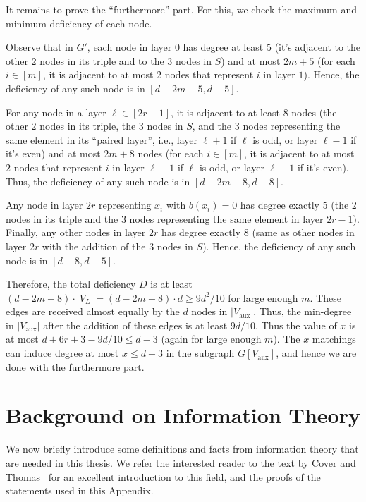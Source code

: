 \documentclass[11pt,letterpaper]{article}
\renewcommand{\geq}{\geqslant}
\renewcommand{\leq}{\leqslant}
\theoremstyle{definition}
\newcommand{\Vaux}{V_{\text{aux}}}
\begin{document}
    It remains to prove the ``furthermore'' part. For this, we check the maximum and minimum deficiency of each node.

    Observe that in $G'$, each node in layer $0$ has degree at least $5$ (it's adjacent to the other $2$ nodes in its triple and to the $3$ nodes in $S$) and at most $2m+5$ (for each $i\in [m]$, it is adjacent to at most $2$ nodes that represent $i$ in layer $1$). Hence, the deficiency of any such node is in $[d-2m-5, d-5]$. 
    
    For any node in a layer $\ell\in [2r-1]$, it is adjacent to at least $8$ nodes (the other $2$ nodes in its triple, the $3$ nodes in $S$, and the $3$ nodes representing the same element in its ``paired layer'', i.e., layer $\ell+1$ if $\ell$ is odd, or layer $\ell-1$ if it's even) and at most $2m+8$ nodes (for each $i\in [m]$, it is adjacent to at most $2$ nodes that represent $i$ in layer $\ell-1$ if $\ell$ is odd, or layer $\ell+1$ if it's even). Thus, the deficiency of any such node is in $[d-2m-8, d-8]$.

    Any node in layer $2r$ representing $x_i$ with $b(x_i)=0$ has degree exactly $5$ (the $2$ nodes in its triple and the $3$ nodes representing the same element in layer $2r-1$). Finally, any other nodes in layer $2r$ has degree exactly $8$ (same as other nodes in layer $2r$ with the addition of the $3$ nodes in $S$). Hence, the deficiency of any such node is in $[d-8, d-5]$. 

    Therefore, the total deficiency $D$ is at least $(d-2m-8)\cdot |V_L|= (d-2m-8)\cdot d \geq 9d^2/10$ for large enough $m$. These edges are received almost equally by the $d$ nodes in $|\Vaux|$. Thus, the min-degree in $|\Vaux|$ after the addition of these edges is at least $9d/10$. Thus the value of $x$ is at most $d+6r+3-9d/10\leq d-3$ (again for large enough $m$). The $x$ matchings can induce degree at most $x\leq d-3$ in the subgraph $G[\Vaux]$, and hence we are done with the furthermore part.    




\section{Background on Information Theory}\label{prelim-sec:info}

We now briefly introduce some definitions and facts from information theory that are needed in this thesis. We refer the interested reader to the text by Cover and Thomas~\cite{CoverT06} for an excellent introduction to this field, 
and the proofs of the statements used in this Appendix. 
\end{document}
